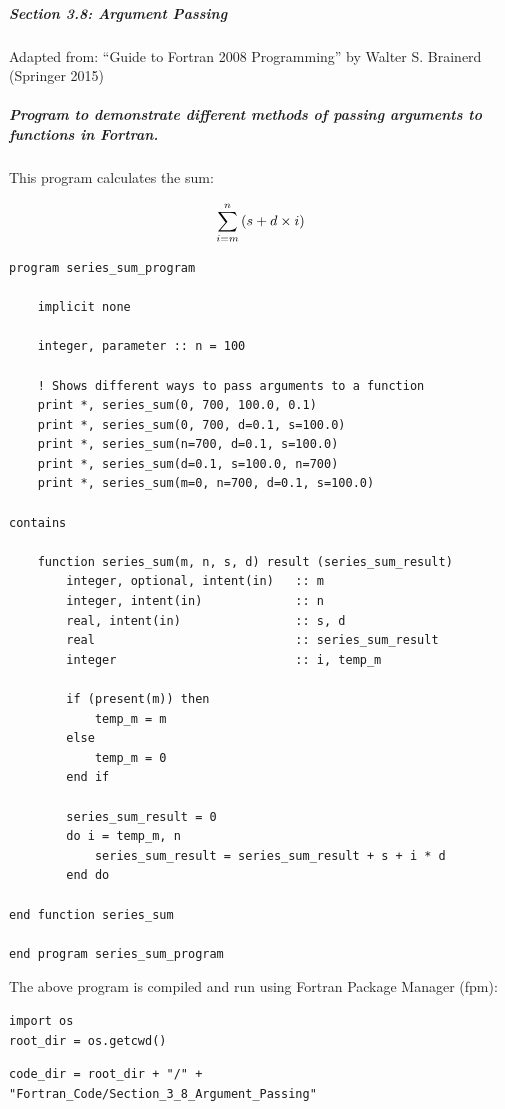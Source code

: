 \subparagraph{Section 3.8: Argument Passing}

Adapted from: ``Guide to Fortran 2008 Programming'' by Walter S. Brainerd (Springer 2015)

\subparagraph{Program to demonstrate different methods of passing arguments to functions in Fortran.}

This program calculates the sum:

\begin{equation}
\Large \sum_{i=m}^n \left(s+d \times i \right)
\end{equation}

\begin{verbatim}
program series_sum_program

    implicit none
    
    integer, parameter :: n = 100
    
    ! Shows different ways to pass arguments to a function
    print *, series_sum(0, 700, 100.0, 0.1)
    print *, series_sum(0, 700, d=0.1, s=100.0)
    print *, series_sum(n=700, d=0.1, s=100.0)
    print *, series_sum(d=0.1, s=100.0, n=700)
    print *, series_sum(m=0, n=700, d=0.1, s=100.0)

contains

    function series_sum(m, n, s, d) result (series_sum_result)
        integer, optional, intent(in)   :: m
        integer, intent(in)             :: n
        real, intent(in)                :: s, d
        real                            :: series_sum_result
        integer                         :: i, temp_m

        if (present(m)) then
            temp_m = m
        else
            temp_m = 0
        end if

        series_sum_result = 0
        do i = temp_m, n
            series_sum_result = series_sum_result + s + i * d
        end do

end function series_sum

end program series_sum_program
\end{verbatim}

The above program is compiled and run using Fortran Package Manager (fpm):

\begin{verbatim}
import os
root_dir = os.getcwd()
\end{verbatim}

\begin{verbatim}
code_dir = root_dir + "/" + "Fortran_Code/Section_3_8_Argument_Passing"
\end{verbatim}

